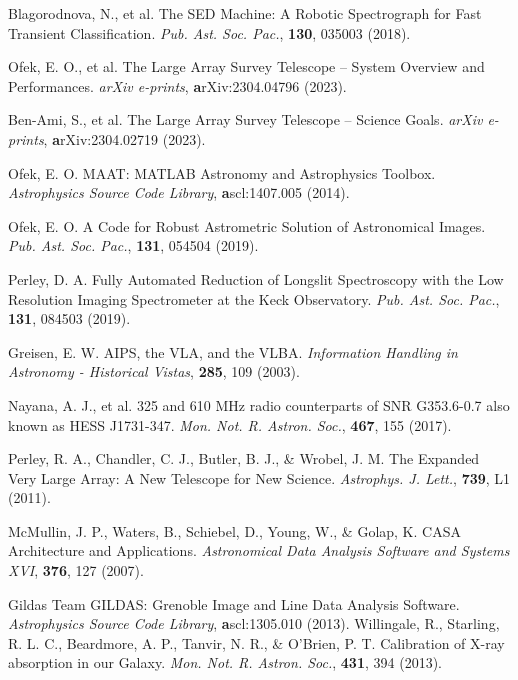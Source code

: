 \documentclass{nature_plusfigure}
\newcommand{\mn}{{Mon. Not. R. Astron. Soc.}}
\newcommand{\mnras}{\mn}
\newcommand{\apjl}{{Astrophys. J. Lett.}}
\newcommand{\pasp}{{Pub. Ast. Soc. Pac.}}
\begin{document}
\begin{methods}
\begin{thebibliography}{10}
  Blagorodnova, N., et al. The SED Machine: A Robotic Spectrograph for Fast Transient Classification. \emph{\pasp}, \textbf{130}, 035003 (2018). 

  Ofek, E. O., et al. The Large Array Survey Telescope -- System Overview and Performances. \emph{arXiv e-prints}, \textbf arXiv:2304.04796 (2023). 

 Ben-Ami, S., et al. The Large Array Survey Telescope -- Science Goals. \emph{arXiv e-prints}, \textbf arXiv:2304.02719 (2023). 

 Ofek, E. O. MAAT: MATLAB Astronomy and Astrophysics Toolbox. \emph{Astrophysics Source Code Library}, \textbf ascl:1407.005 (2014). 

 Ofek, E. O. A Code for Robust Astrometric Solution of Astronomical Images. \emph{\pasp}, \textbf{131}, 054504 (2019). 

 Perley, D. A. Fully Automated Reduction of Longslit Spectroscopy with the Low Resolution Imaging Spectrometer at the Keck Observatory. \emph{\pasp}, \textbf{131}, 084503 (2019). 


  Greisen, E. W. AIPS, the VLA, and the VLBA. \emph{Information Handling in Astronomy - Historical Vistas}, \textbf{285}, 109 (2003). 

 Nayana, A. J., et al. 325 and 610 MHz radio counterparts of SNR G353.6-0.7 also known as HESS J1731-347. \emph{\mnras}, \textbf{467}, 155 (2017). 

 Perley, R. A., Chandler, C. J., Butler, B. J., \& Wrobel, J. M. The Expanded Very Large Array: A New Telescope for New Science. \emph{\apjl}, \textbf{739}, L1 (2011). 

 McMullin, J. P., Waters, B., Schiebel, D., Young, W., \& Golap, K. CASA Architecture and Applications. \emph{Astronomical Data Analysis Software and Systems XVI}, \textbf{376}, 127 (2007). 

 Gildas Team GILDAS: Grenoble Image and Line Data Analysis Software. \emph{Astrophysics Source Code Library}, \textbf ascl:1305.010 (2013). 
 Willingale, R., Starling, R. L. C., Beardmore, A. P., Tanvir, N. R., \& O'Brien, P. T. Calibration of X-ray absorption in our Galaxy. \emph{\mnras}, \textbf{431}, 394 (2013). 



\end{thebibliography}
\end{methods}
\end{document}
